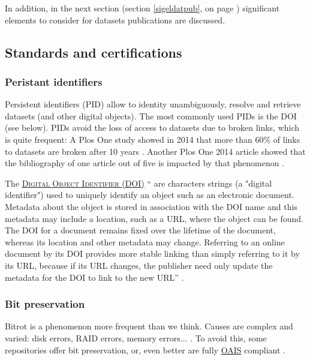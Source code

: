 In addition, in the next section (section \ref{sigeldatpub}, on page \pageref{sigeldatpub}) significant elements to consider for datasets publications are discussed.

\subsection{Standards and certifications}

\subsubsection{Peristant identifiers}

Persistent identifiers (PID) allow to identity unambiguously, resolve and retrieve datasets (and other digital objects). The most commonly used PIDs is the DOI (see below). PIDs avoid the loss of access to datasets due to broken links, which is quite frequent: A Plos One study showed in 2014 that more than 60\% of links to datasets are broken after 10
years \cite{pepe_how_2014}. Another Plos One 2014 article showed that the bibliography of one article out of five is impacted by that phenomenon \cite{van_de_sompel_scholarly_2014}.

\noindent The  \textsc{\href{http://www.doi.org/}{Digital Object Identifier (DOI)}} `` are characters strings (a "digital identifier") used to uniquely identify an object such as an electronic document. Metadata about the object is stored in association with the DOI name and this metadata may include a location, such as a URL, where the object can be found. The DOI for a document remains fixed over the lifetime of the document, whereas its location and other metadata may change. Referring to an online document by its DOI provides more stable linking than simply referring to it by its URL, because if its URL changes, the publisher need only update the metadata for the DOI to link to the new URL'' \cite{wikipedia_digital_2014}.

\subsubsection{Bit preservation}
Bitrot is a phenomenon more frequent than we think. Causes are complex and varied: disk errors, RAID errors, memory errors... \cite{harris_data_2007,panzer-steindel_data_2007}. To avoid this, some repositories offer bit preservation, or, even better are fully \href{http://public.ccsds.org/publications/archive/650x0m2.pdf}{OAIS} compliant \cite{wikipedia_oais_2015}.

